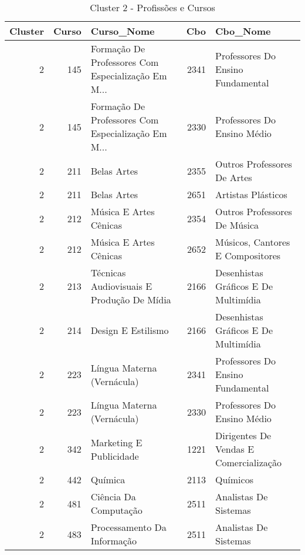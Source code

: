 \begin{table}
\centering
\caption{Cluster 2 - Profissões e Cursos }
\label{tab:Profissoes_Cluster2}
\begin{tabular}{rrlrl}
\toprule
 Cluster &  Curso &                                         Curso\_Nome &  Cbo &                                   Cbo\_Nome \\
\midrule
       2 &    145 & Formação De Professores Com Especialização Em M... & 2341 &          Professores Do Ensino Fundamental \\
       2 &    145 & Formação De Professores Com Especialização Em M... & 2330 &                Professores Do Ensino Médio \\
       2 &    211 &                                        Belas Artes & 2355 &                Outros Professores De Artes \\
       2 &    211 &                                        Belas Artes & 2651 &                         Artistas Plásticos \\
       2 &    212 &                             Música E Artes Cênicas & 2354 &               Outros Professores De Música \\
       2 &    212 &                             Música E Artes Cênicas & 2652 &           Músicos, Cantores E Compositores \\
       2 &    213 &          Técnicas Audiovisuais E Produção De Mídia & 2166 &       Desenhistas Gráficos E De Multimídia \\
       2 &    214 &                                 Design E Estilismo & 2166 &       Desenhistas Gráficos E De Multimídia \\
       2 &    223 &                         Língua Materna (Vernácula) & 2341 &          Professores Do Ensino Fundamental \\
       2 &    223 &                         Língua Materna (Vernácula) & 2330 &                Professores Do Ensino Médio \\
       2 &    342 &                            Marketing E Publicidade & 1221 &   Dirigentes De Vendas E  Comercialização  \\
       2 &    442 &                                            Química & 2113 &                                   Químicos \\
       2 &    481 &                              Ciência Da Computação & 2511 &                      Analistas De Sistemas \\
       2 &    483 &                        Processamento Da Informação & 2511 &                      Analistas De Sistemas \\

\end{tabular}
\end{table}
